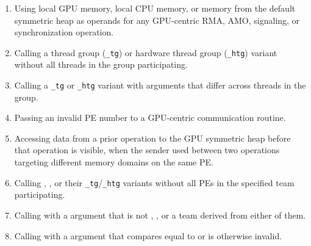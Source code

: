 \begin{enumerate}
  of the array variants of wait-until and test.
\item Using local \ac{GPU} memory, local CPU memory, or memory from the default
  symmetric heap as operands for any GPU-centric \ac{RMA}, \ac{AMO}, signaling,
  or synchronization operation.
\item Calling a thread group (\texttt{\_tg}) or hardware thread group
  (\texttt{\_htg}) variant without all threads in the group participating.
\item Calling a \texttt{\_tg} or \texttt{\_htg} variant with arguments that
  differ across threads in the group.
\item Passing an invalid \ac{PE} number to a GPU-centric communication routine.
\item Accessing data from a prior operation to the \ac{GPU} symmetric heap before
  that operation is visible, when the sender used  between two
  operations targeting different memory domains on the same \ac{PE}.
\item Calling , , or their
  \texttt{\_tg}/\texttt{\_htg} variants without all \acp{PE} in the specified
  team participating.
\item Calling  with a  argument that is not
  , , or a
  team derived from either of them.
\item Calling  with a  argument that compares
  equal to  or is otherwise invalid.
\end{enumerate}

\clearpage

